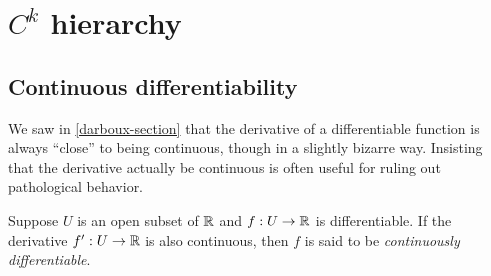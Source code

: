 \begin{comment}
\begin{exercise} \label{derivative-discontinuous-two-points}
	For any $a < b$ in $\R$, construct a differentiable function $h : \R \to \R$ supported\footnotemark\ on $[a,b]$ such that $\|h'\|_{\spn} = 1$ and $h'$ is continuous everywhere except at $a$ and $b$. 
\end{exercise}

\footnotetext{Recall that the \emph{support}\index{support} of a function is the closure of the subset of its domain where it takes nonzero values.}

\begin{example}[Volterra]
	Let $F$ be a closed subset of $\R$ with empty interior. Then the complement of $F$ is an open subset of $\R$, so
	\[ \R \setminus F = \bigcup_{n = 0}^\infty (a_n, b_n) \]
	where the open intervals $(a_n, b_n)$ are all disjoint (cf. \cite[theorem 6.17]{protter-morrey}). Use \cref{derivative-discontinuous-two-points} to construct a differentiable function $h_n : \R \to \R$ supported on $[a_n, b_n]$ which is discontinuous at $a_n$ and $b_n$. Then consider the function
	\[ h(x) = \sum_{n = 0}^\infty \frac{h_n(x)}{2^n}. \] 
	This looks like an infinite series, but it's not. Every $x \in \R$ is either in $F$, in which case $h(x) = 0$, or there exists a unique integer $n$ such that $x \in (a_n, b_n)$, in which case $h(x) = h_n(x)/2^n$. Then $h$ is differentiable and $h'$ is discontinuous at all of the $a_0, b_0, a_1, b_1, \dotsc$. 
\end{example}
\end{comment}

\section{\texorpdfstring{$C^k$}{Ck} hierarchy} 

\subsection{Continuous differentiability}

We saw in \cref{darboux-section} that the derivative of a differentiable function is always ``close'' to being continuous, though in a slightly bizarre way. Insisting that the derivative actually be continuous is often useful for ruling out pathological behavior. 

\begin{definition}
	Suppose $U$ is an open subset of $\mathbb{R}$ and $f : U \to \mathbb{R}$ is differentiable. If the derivative $f' : U \to \mathbb{R}$ is also continuous, then $f$ is said to be \emph{continuously differentiable}. 
\end{definition}

